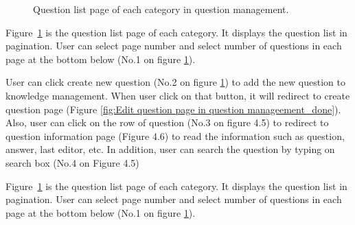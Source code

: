 \documentclass[12pt,oneside,openright,a4paper]{cpe-english-project}
\begin{document}
\pagebreak
	\begin{figure}[!h]\centering
		\caption{Question list page of each category in question management.}\label{fig:Question list page of each category in question management_done}
	\end{figure}
	\begin{flushleft}
		Figure~\ref*{fig:Question list page of each category in question management_done} is the question list page of each category. It displays the question list in pagination. User can select page number and select number of questions in each page at the bottom below (No.1 on figure \ref*{fig:Question list page of each category in question management_done}).
	\end{flushleft}
	\begin{flushleft}
		User can click create new question (No.2 on figure \ref*{fig:Question list page of each category in question management_done}) to add the new question to knowledge management. When user click on that button, it will redirect to create question page (Figure \ref*{fig:Edit question page in question manageement_done}). Also, user can click on the row of question (No.3 on figure 4.5) to redirect to question information page (Figure 4.6) to read the information such as question, answer, last editor, etc. In addition, user can search the question by typing on search box (No.4 on Figure 4.5)
	\end{flushleft}
	\begin{flushleft}
		Figure~\ref*{fig:Question list page of each category in question management_done} is the question list page of each category. It displays the question list in pagination. User can select page number and select number of questions in each page at the bottom below (No.1 on figure \ref*{fig:Question list page of each category in question management_done}).
	\end{flushleft}
\end{document}
